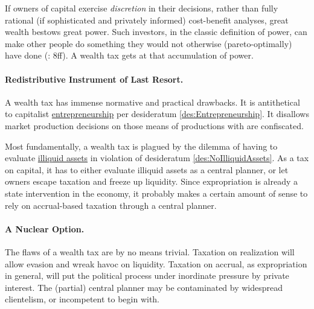 If owners of capital exercise \emph{discretion} in their decisions, rather than fully rational (if sophisticated and privately informed) cost-benefit analyses, great wealth bestows great power. Such investors, in the classic definition of power, can make other people do something they would not otherwise (pareto-optimally) have done (\citealt{Geoff2002}: 8ff). A wealth tax gets at that accumulation of power.

\paragraph{Redistributive Instrument of Last Resort.} A wealth tax has immense normative and practical drawbacks. It is antithetical to capitalist \hyperref[des:Entrepreneurship]{entrepreneurship} per desideratum \ref{des:Entrepreneurship}. It disallows market production decisions on those means of productions with are confiscated.

Most fundamentally, a wealth tax is plagued by the dilemma of having to evaluate \hyperref[des:NoIlliquidAssets]{illiquid assets} in violation of desideratum \ref{des:NoIlliquidAssets}. As a tax on capital, it has to either evaluate illiquid assets as a central planner, or let owners escape taxation and freeze up liquidity. Since expropriation is already a state intervention in the economy, it probably makes a certain amount of sense to rely on accrual-based taxation through a central planner.

\paragraph{A Nuclear Option.} The flaws of a wealth tax are by no means trivial. Taxation on realization will allow evasion and wreak havoc on liquidity. Taxation on accrual, as expropriation in general, will put the political process under inordinate pressure by private interest. The (partial) central planner may be contaminated by widespread clientelism, or incompetent to begin with.

